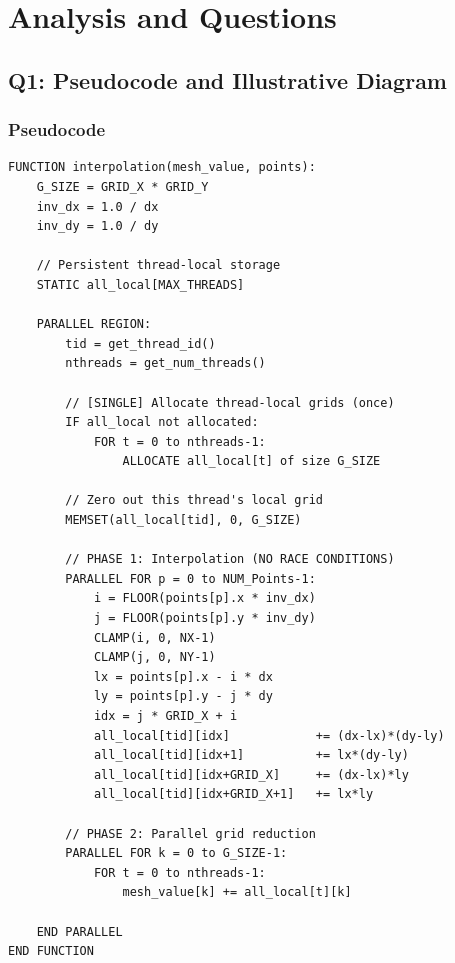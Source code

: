 \documentclass[12pt,a4paper]{article}
\begin{document}
\section{Analysis and Questions}

\subsection{Q1: Pseudocode and Illustrative Diagram}

\subsubsection{Pseudocode}

\begin{lstlisting}[style=pseudocode, caption={Pseudocode for parallel interpolation}]
FUNCTION interpolation(mesh_value, points):
    G_SIZE = GRID_X * GRID_Y
    inv_dx = 1.0 / dx
    inv_dy = 1.0 / dy

    // Persistent thread-local storage
    STATIC all_local[MAX_THREADS]

    PARALLEL REGION:
        tid = get_thread_id()
        nthreads = get_num_threads()

        // [SINGLE] Allocate thread-local grids (once)
        IF all_local not allocated:
            FOR t = 0 to nthreads-1:
                ALLOCATE all_local[t] of size G_SIZE

        // Zero out this thread's local grid
        MEMSET(all_local[tid], 0, G_SIZE)

        // PHASE 1: Interpolation (NO RACE CONDITIONS)
        PARALLEL FOR p = 0 to NUM_Points-1:
            i = FLOOR(points[p].x * inv_dx)
            j = FLOOR(points[p].y * inv_dy)
            CLAMP(i, 0, NX-1)
            CLAMP(j, 0, NY-1)
            lx = points[p].x - i * dx
            ly = points[p].y - j * dy
            idx = j * GRID_X + i
            all_local[tid][idx]            += (dx-lx)*(dy-ly)
            all_local[tid][idx+1]          += lx*(dy-ly)
            all_local[tid][idx+GRID_X]     += (dx-lx)*ly
            all_local[tid][idx+GRID_X+1]   += lx*ly

        // PHASE 2: Parallel grid reduction
        PARALLEL FOR k = 0 to G_SIZE-1:
            FOR t = 0 to nthreads-1:
                mesh_value[k] += all_local[t][k]

    END PARALLEL
END FUNCTION
\end{lstlisting}
\end{document}
